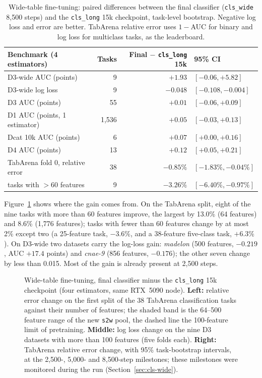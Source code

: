\documentclass[11pt]{article}
\begin{document}
\begin{table}[tbp]
\centering
\footnotesize
\begin{tabular}{lrrl}
\toprule
Benchmark (4 estimators) & Tasks & Final $-$ \texttt{cls\_long} 15k & 95\% CI \\
\midrule
D3-wide AUC (points) & 9 & $+1.93$ & $[-0.06, +5.82]$ \\
D3-wide log loss & 9 & $-0.048$ & $[-0.108, -0.004]$ \\
D3 AUC (points) & 55 & $+0.01$ & $[-0.06, +0.09]$ \\
D1 AUC (points, 1 estimator) & 1,536 & $+0.05$ & $[-0.03, +0.13]$ \\
Dcat 10k AUC (points) & 6 & $+0.07$ & $[+0.00, +0.16]$ \\
D4 AUC (points) & 13 & $+0.12$ & $[+0.05, +0.21]$ \\
TabArena fold 0, relative error & 38 & $-0.85\%$ & $[-1.83\%, -0.04\%]$ \\
\quad tasks with $>60$ features & 9 & $-3.26\%$ & $[-6.40\%, -0.97\%]$ \\
\bottomrule
\end{tabular}
\caption{Wide-table fine-tuning: paired differences between the final classifier (\texttt{cls\_wide} 8,500 steps) and the \texttt{cls\_long} 15k checkpoint, task-level bootstrap. Negative log loss and error are better. TabArena relative error uses $1-$AUC for binary and log loss for multiclass tasks, as the leaderboard.}
\label{tab:clswide}
\end{table}

Figure~\ref{fig:wide} shows where the gain comes from. On the TabArena split, eight of the nine tasks with more than 60 features improve, the largest by 13.0\% (64 features) and 8.6\% (1,776 features); tasks with fewer than 60 features change by at most 2\% except two (a 25-feature task, $-3.6\%$, and a 38-feature five-class task, $+6.3\%$). On D3-wide two datasets carry the log-loss gain: \emph{madelon} (500 features, $-0.219$, AUC $+17.4$ points) and \emph{cnae-9} (856 features, $-0.176$); the other seven change by less than 0.015. Most of the gain is already present at 2,500 steps. %

\begin{figure}[tbp]
\centering
\resizebox{\linewidth}{!}{}
\caption{Wide-table fine-tuning, final classifier minus the \texttt{cls\_long} 15k checkpoint (four estimators, same RTX~5090 node). \textbf{Left:} relative error change on the first split of the 38 TabArena classification tasks against their number of features; the shaded band is the 64--500 feature range of the new \texttt{s2w} pool, the dashed line the 100-feature limit of pretraining. \textbf{Middle:} log loss change on the nine D3 datasets with more than 100 features (five folds each). \textbf{Right:} TabArena relative error change, with 95\% task-bootstrap intervals, at the 2,500-, 5,000- and 8,500-step milestones; these milestones were monitored during the run (Section~\ref{sec:cls-wide}).}
\label{fig:wide}
\end{figure}
\end{document}
